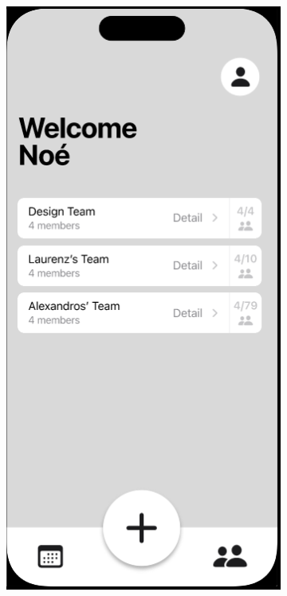 \documentclass[11pt]{article}
\begin{document}
\begin{figure}
     \centering
     \begin{subfigure}[b]{0.4\textwidth}
         \centering
         \includegraphics[width=\textwidth]{figures/Main-Screen.PNG}

\end{subfigure}
\end{figure}
\end{document}
